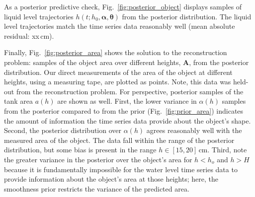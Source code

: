 \documentclass[openacc]{rsproca_new}%
\newcommand\themodel {$h(t; h_0, \boldsymbol \alpha, \boldsymbol\theta)$\xspace}
\begin{document}
As a posterior predictive check, Fig.~\ref{fig:posterior_object} displays samples of liquid level trajectories \themodel from the posterior distribution. The liquid level trajectories match the time series data reasonably well (mean absolute residual: xx\,cm). 

Finally, Fig.~\ref{fig:posterior_area} shows the solution to the reconstruction problem: samples of the object area over different heights, $\mathbf{A}$, from the posterior distribution. Our direct measurements of the area of the object at different heights, using a measuring tape, are plotted as points. Note, this data was held-out from the reconstruction problem. 
For perspective, posterior samples of the tank area $a(h)$ are shown as well. 
First, the lower variance in $\alpha(h)$ samples from the posterior compared to from the prior (Fig.~\ref{fig:prior_area}) indicates the amount of information the time series data provide about the object's shape. 
Second, the posterior distribution over $\alpha(h)$ agrees reasonably well with the measured area of the object. The data fall within the range of the posterior distribution, but some bias is present in the range $h\in[15, 20]$\,cm. 
Third, note the greater variance in the posterior over the object's area for $h<h_o$ and $h>H$ because it is fundamentally impossible for the water level time series data to provide information about the object's area at those heights; here, the smoothness prior restricts the variance of the predicted area. 
 
\end{document}

